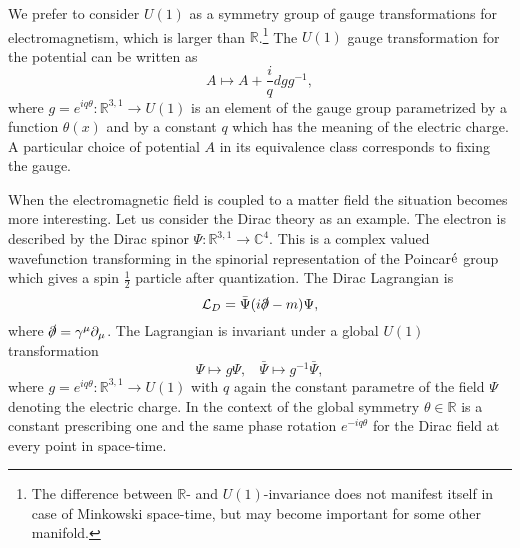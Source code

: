 \documentclass[11pt]{report}
\theoremstyle{plain}
\theoremstyle{definition}
\theoremstyle{remark}
\theoremstyle{remark}
\numberwithin{equation}{section}
\begin{document}
We prefer to consider $U(1)$ as a symmetry group of gauge transformations for electromagnetism, which is larger than $\mathbb{R}$.\footnote{The difference between $\mathbb{R}$- and $U(1)$-invariance does not manifest itself in case of Minkowski space-time, but may become important for some other manifold.} 
The $U(1)$ gauge transformation for the potential can be written as
\begin{equation}
A \longmapsto A + \frac{i}{q}dg g^{-1},
\end{equation}
where $g = e^{iq\theta}: \mathbb{R}^{3,1} \to U(1)$ is an element of the gauge group parametrized by a function $\theta (x)$ and by a constant $q$ which has the meaning of the electric charge.
A particular choice of potential $A$ in its equivalence class corresponds to fixing the gauge. 

When the electromagnetic field is coupled to a matter field the situation becomes more interesting. Let us consider the Dirac theory as an example. The electron is described by the Dirac spinor $\Psi : \mathbb{R}^{3,1} \to \mathbb{C}^4$. This is a complex valued wavefunction transforming in the spinorial representation of the Poincar$\acute{\rm e}$ group which gives a spin $\frac{1}{2}$  particle after quantization. The Dirac Lagrangian is
%
\begin{equation}\label{DL}
\mathcal{L}_D = \bar{\Psi}(i \slashed{\partial} - m)\Psi,
\end{equation}
%
where $\slashed{\partial} = \gamma^{\mu} \partial_{\mu}$. 
The Lagrangian is invariant under a global $U(1)$ transformation
%
\begin{equation}
\Psi \longmapsto g\Psi , \,\,\,\,\ \bar{\Psi} \longmapsto g^{-1}\bar{\Psi},
\end{equation}
where $g = e^{iq\theta}: \mathbb{R}^{3,1} \to U(1)$ with $q$ again the constant parametre of the field $\Psi$ denoting the electric charge. In the context of the global symmetry $\theta \in \mathbb{R}$ is a constant prescribing one and the same phase rotation $e^{-iq\theta}$ for the Dirac field at every point in space-time. 
\end{document}
